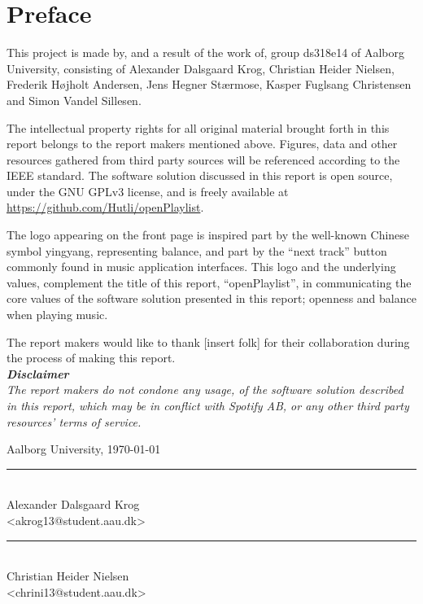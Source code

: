 \chapter*{Preface}\label{ch:preface}
 \thispagestyle{empty}
This project is made by, and a result of the work of, group ds318e14 of Aalborg University, consisting of Alexander Dalsgaard Krog, Christian Heider Nielsen, Frederik Højholt Andersen, Jens Hegner Stærmose, Kasper Fuglsang Christensen and Simon Vandel Sillesen.

The intellectual property rights for all original material brought forth in this report belongs to the report makers mentioned above. Figures, data and other resources gathered from third party sources will be referenced according to the IEEE standard. The software solution discussed in this report is open source, under the GNU GPLv3 license, and is freely available at \url{https://github.com/Hutli/openPlaylist}.

The logo appearing on the front page is inspired part by the
well-known Chinese symbol yingyang, representing balance, and part by the \enquote{next
  track} button commonly found in music application interfaces. This
logo and the underlying values, complement the title of this report,
\enquote{openPlaylist}, in communicating the core values of the
software solution presented in this report; openness and balance when
playing music.

The report makers would like to thank [insert folk] for their collaboration during the process of making this report.\\

\noindent
\textit{
\textbf{Disclaimer}\\
The report makers do not condone any usage, of the software solution described in this report, which may be in conflict with Spotify AB, or any other third party resources' terms of service.}

\vspace{\baselineskip}\hfill Aalborg University, \today
\vfill

\noindent
\begin{minipage}[b]{0.45\textwidth}
 \centering
 \rule{\textwidth}{0.5pt}\\
  Alexander Dalsgaard Krog\\
 {\footnotesize <akrog13@student.aau.dk>}
\end{minipage}
\hfill
\begin{minipage}[b]{0.45\textwidth}
 \centering
 \rule{\textwidth}{0.5pt}\\
  Christian Heider Nielsen\\
 {\footnotesize <chrini13@student.aau.dk>}
\end{minipage}
\vspace{3\baselineskip}

